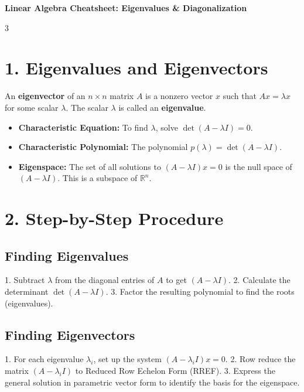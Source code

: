 \begin{center}
\textbf{\Large Linear Algebra Cheatsheet: Eigenvalues \& Diagonalization}
\end{center}

\begin{multicols}{3}
\raggedright

\section*{1. Eigenvalues and Eigenvectors}
An \textbf{eigenvector} of an $n \times n$ matrix $A$ is a nonzero vector $x$ such that $Ax = \lambda x$ for some scalar $\lambda$. The scalar $\lambda$ is called an \textbf{eigenvalue}.

\begin{itemize}
  \item \textbf{Characteristic Equation:} To find $\lambda$, solve $\det(A - \lambda I) = 0$.
  \item \textbf{Characteristic Polynomial:} The polynomial $p(\lambda) = \det(A - \lambda I)$.
  \item \textbf{Eigenspace:} The set of all solutions to $(A - \lambda I)x = 0$ is the null space of $(A - \lambda I)$. This is a subspace of $\mathbb{R}^n$.
\end{itemize}

\section*{2. Step-by-Step Procedure}

\subsection*{Finding Eigenvalues}
1. Subtract $\lambda$ from the diagonal entries of $A$ to get $(A - \lambda I)$.
2. Calculate the determinant $\det(A - \lambda I)$.
3. Factor the resulting polynomial to find the roots (eigenvalues).

\subsection*{Finding Eigenvectors}
1. For each eigenvalue $\lambda_i$, set up the system $(A - \lambda_i I)x = 0$.
2. Row reduce the matrix $(A - \lambda_i I)$ to Reduced Row Echelon Form (RREF).
3. Express the general solution in parametric vector form to identify the basis for the eigenspace.


\end{multicols}
